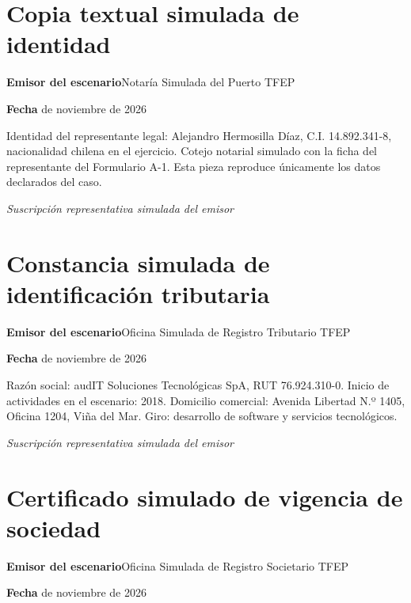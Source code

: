 \clearpage
\section*{Copia textual simulada de identidad}\label{adm:cedula}

\rotuloSimuladoSobreUno
\noindent\textbf{Emisor del escenario}\enspace Notaría Simulada del Puerto TFEP\par
\noindent\textbf{Fecha} de noviembre de 2026\par
\medskip

Identidad del representante legal: Alejandro Hermosilla Díaz, C.I. 14.892.341-8, nacionalidad chilena en el ejercicio. Cotejo notarial simulado con la ficha del representante del Formulario A-1. Esta pieza reproduce únicamente los datos declarados del caso.

\medskip
\noindent\textit{Suscripción representativa simulada del emisor}\par
\label{adm:cedula-fin}

\clearpage
\section*{Constancia simulada de identificación tributaria}\label{adm:rut}

\rotuloSimuladoSobreUno
\noindent\textbf{Emisor del escenario}\enspace Oficina Simulada de Registro Tributario TFEP\par
\noindent\textbf{Fecha} de noviembre de 2026\par
\medskip

Razón social: audIT Soluciones Tecnológicas SpA, RUT 76.924.310-0. Inicio de actividades en el escenario: 2018. Domicilio comercial: Avenida Libertad N.º 1405, Oficina 1204, Viña del Mar. Giro: desarrollo de software y servicios tecnológicos.

\medskip
\noindent\textit{Suscripción representativa simulada del emisor}\par
\label{adm:rut-fin}

\clearpage
\section*{Certificado simulado de vigencia de sociedad}\label{adm:vigencia}

\rotuloSimuladoSobreUno
\noindent\textbf{Emisor del escenario}\enspace Oficina Simulada de Registro Societario TFEP\par
\noindent\textbf{Fecha} de noviembre de 2026\par
\medskip

